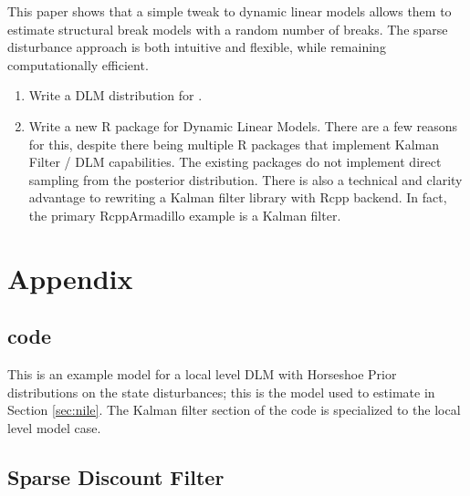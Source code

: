 \documentclass{article}
\begin{document}
This paper shows that a simple tweak to dynamic linear models allows them to estimate structural break models with a random number of breaks.
The sparse disturbance approach is both intuitive and flexible, while remaining computationally efficient.

\begin{enumerate}
\item Write a DLM distribution for \Stan{}.
\item Write a new R package for Dynamic Linear Models. There are a few reasons for this, despite there being multiple R packages that implement Kalman Filter / DLM capabilities. 
The existing packages do not implement direct sampling from the posterior distribution. 
There is also a technical and clarity advantage to rewriting a Kalman filter library with Rcpp backend. In fact, the primary RcppArmadillo example is 
a Kalman filter.
\end{enumerate}

\clearpage{}

\printbibliography{}

\section{Appendix}
\label{sec:appendix
}
\subsection{code}
\label{sec:code}

This is an example \Stan{} model for a local level DLM with Horseshoe Prior distributions on the state disturbances; this is the \Stan{} model used to estimate  in Section \ref{sec:nile}. 
The Kalman filter section of the \Stan{} code is specialized to the local level model case.

\begin{singlespace}
%    
\end{singlespace}

\subsection{Sparse Discount Filter}
\label{sec:sparse-disc-filt}
\end{document}
